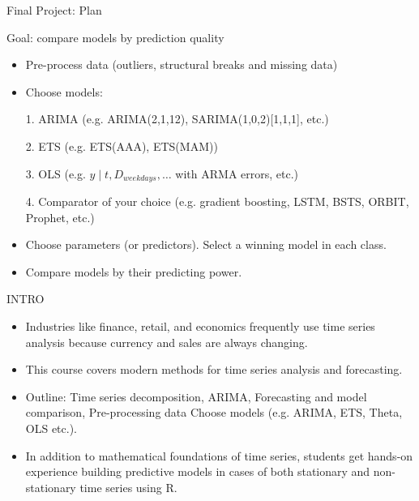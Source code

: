 
\begin{frame} %
	
	
\end{frame}



\begin{frame}{Final Project: Plan}
	
	Goal: compare models by prediction quality
	
	\begin{itemize}[<+->]
		\item \alert{Pre-process data} (outliers, structural breaks and missing data)
		\item Choose \alert{models}:

				1. ARIMA (e.g. ARIMA(2,1,12), SARIMA(1,0,2)[1,1,1], etc.)
				
				2. ETS (e.g. ETS(AAA), ETS(MAM))
				
				
				3. OLS (e.g. $y\mid t, D_{weekdays}, \ldots$ with ARMA errors, etc.)
				
				4. Comparator of your choice (e.g. gradient boosting, LSTM, BSTS, ORBIT, Prophet, etc.)

		\item Choose \alert{parameters} (or predictors). Select a winning model in \alert{each class}.
		\item Compare models by their \alert{predicting power}.
	\end{itemize}
	
\end{frame}




\begin{frame} %
	
	
\end{frame}




\begin{frame}{INTRO}
	
	\begin{itemize}
		\item Industries like finance, retail, and economics frequently use time series analysis because currency and sales are always changing.
		\item This course covers modern methods for time series analysis and forecasting. 
		\item Outline: Time series decomposition,
		ARIMA,
		Forecasting and model comparison,
		Pre-processing data Choose models (e.g. ARIMA, ETS, Theta, OLS etc.).
		\item In addition to mathematical foundations of time series, students get hands-on experience building predictive models in cases of both stationary and non-stationary time series using R. 
	\end{itemize}
	
\end{frame}




